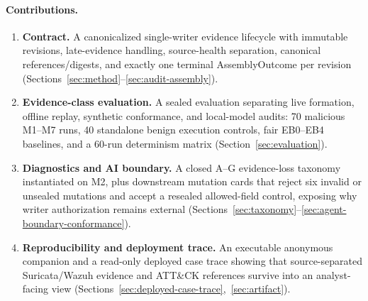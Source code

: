 \paragraph{Contributions.}
\begin{enumerate}
  \item \textbf{Contract.} A canonicalized single-writer evidence lifecycle with immutable
        revisions, late-evidence handling, source-health separation, canonical references/digests,
        and exactly one terminal AssemblyOutcome per revision
        (Sections~\ref{sec:method}--\ref{sec:audit-assembly}).
  \item \textbf{Evidence-class evaluation.} A sealed evaluation separating live formation, offline
        replay, synthetic conformance, and local-model audits: 70 malicious M1--M7 runs, 40
        standalone benign execution controls, fair EB0--EB4 baselines, and a 60-run determinism
        matrix (Section~\ref{sec:evaluation}).
  \item \textbf{Diagnostics and AI boundary.} A closed A--G evidence-loss taxonomy instantiated on
        M2, plus downstream mutation cards that reject six invalid or unsealed mutations and accept
        a resealed allowed-field control, exposing why writer authorization remains external
        (Sections~\ref{sec:taxonomy}--\ref{sec:agent-boundary-conformance}).
  \item \textbf{Reproducibility and deployment trace.} An executable anonymous companion and a
        read-only deployed case trace showing that source-separated Suricata/Wazuh evidence and
        ATT\&CK references survive into an analyst-facing view
        (Sections~\ref{sec:deployed-case-trace},~\ref{sec:artifact}).
\end{enumerate}
